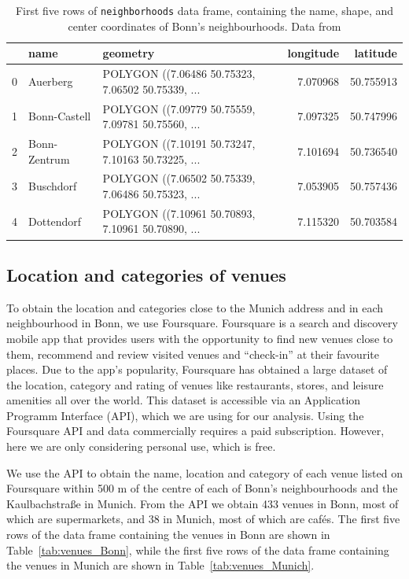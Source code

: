\documentclass[UKenglish]{scrreprt}
\begin{document}
\begin{table}
	\caption[First five rows of neighbourhood data]{First five rows of \texttt{neighborhoods} data frame, containing the name, shape, and center coordinates of Bonn's neighbourhoods. Data from \cite{Ortsteile}}
	\label{tab:neighborhoods}
	\begin{tabular}{lllrr}
		\toprule
		{} &          name &                                           geometry &  longitude &   latitude \\
		\midrule
		0 &      Auerberg &  POLYGON ((7.06486 50.75323, 7.06502 50.75339, ... &   7.070968 &  50.755913 \\
		1 &  Bonn-Castell &  POLYGON ((7.09779 50.75559, 7.09781 50.75560, ... &   7.097325 &  50.747996 \\
		2 &  Bonn-Zentrum &  POLYGON ((7.10191 50.73247, 7.10163 50.73225, ... &   7.101694 &  50.736540 \\
		3 &     Buschdorf &  POLYGON ((7.06502 50.75339, 7.06486 50.75323, ... &   7.053905 &  50.757436 \\
		4 &    Dottendorf &  POLYGON ((7.10961 50.70893, 7.10961 50.70890, ... &   7.115320 &  50.703584 \\
		\bottomrule
	\end{tabular}
\end{table}


\subsection{Location and categories of venues}
To obtain the location and categories close to the Munich address and in each neighbourhood in Bonn, we use Foursquare. 
Foursquare is a search and discovery mobile app that provides users with the opportunity to find new venues close to them, recommend and review visited venues and \enquote{check-in} at their favourite places. Due to the app's popularity, Foursquare has obtained a large dataset of the location, category and rating of venues like restaurants, stores, and leisure amenities all over the world. This dataset is accessible via an Application Programm Interface (API), which we are using for our analysis.
Using the Foursquare API and data commercially requires a paid subscription. However, here we are only considering personal use, which is free. 

We use the API to obtain the name, location and category of each venue listed on Foursquare within 500 m of the centre of each of Bonn's neighbourhoods and the Kaulbachstraße in Munich. From the API we obtain 433 venues in Bonn, most of which are supermarkets, and 38 in Munich, most of which are cafés. The first five rows of the data frame containing the venues in Bonn are shown in Table~\ref{tab:venues_Bonn}, while the first five rows of the data frame containing the venues in Munich are shown in Table~\ref{tab:venues_Munich}.
\end{document}
